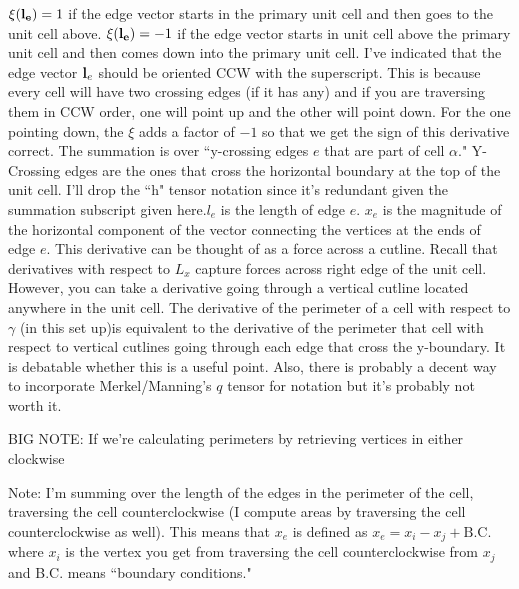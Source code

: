 \documentclass[12pt,a4paper]{article}
\begin{document}
$\xi(\vb{l_e}) = 1$ if the edge vector starts in the primary unit cell and then goes to the unit cell above. $\xi(\vb{l_e}) = -1$ if the edge vector starts in unit cell above the primary unit cell and then comes down into the primary unit cell. I've indicated that the edge vector $\vb{l}_e$ should be oriented CCW with the superscript. This is because every cell will have two crossing edges (if it has any) and if you are traversing them in CCW order, one will point up and the other will point down. For the one pointing down, the $\xi$ adds a factor of $-1$ so that we get the sign of this derivative correct.
The summation is over ``y-crossing edges $e$ that are part of cell $\alpha$." Y-Crossing edges are the ones that cross the horizontal boundary at the top of the unit cell. I'll drop the ``h" tensor notation since it's redundant given the summation subscript given here.$l_e$ is the length of edge $e$. $x_e$ is the magnitude of the horizontal component of the vector connecting the vertices at the ends of edge $e$.  This derivative can be thought of as a force across a cutline. Recall that derivatives with respect to $L_x$ capture forces across right edge of the unit cell. However, you can take a derivative going through a vertical cutline located anywhere in the unit cell. The derivative of the perimeter of a cell with respect to $\gamma$ (in this set up)is equivalent to the derivative of the perimeter that cell with respect to vertical cutlines going through each edge that cross the y-boundary. It is debatable whether this is a useful point. Also, there is probably a decent way to incorporate Merkel/Manning's $q$ tensor for notation but it's probably not worth it. 

BIG NOTE: If we're calculating perimeters by retrieving vertices in either clockwise

Note: I'm summing over the length of the edges in the perimeter of the cell, traversing the cell counterclockwise (I compute areas by traversing the cell counterclockwise as well). This means that $x_e$ is defined as $x_e = x_i - x_j + \text{B.C.}$ where $x_i$ is the vertex you get from traversing the cell counterclockwise from $x_j$ and B.C. means ``boundary conditions." 
\end{document}

